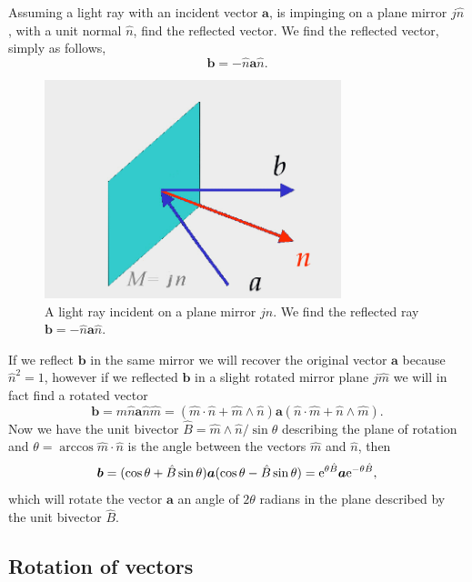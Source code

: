 \documentclass[prb,preprint]{revtex4}
\newcommand{\be}{\begin{equation}}
\newcommand{\ee}{\end{equation}}
\newcommand{\rme}{{\rm{e}}}
\newcommand{\iGA}{{j}}
\begin{document}
Assuming a light ray with an incident vector $ \boldsymbol{a} $, is impinging on a plane mirror $ \iGA \hat{n} $, with a unit normal $ \hat{n} $, find the reflected vector.  We find the reflected vector, simply as follows,
\be
\boldsymbol{b} = - \hat{n} \boldsymbol{a} \hat{n} .
\ee

\begin{figure}[htb]

\begin{center}
\includegraphics[width=3.4in]{Mirror}
\end{center}

\caption{A light ray incident on a plane mirror $ \iGA \hat{n} $.  We find the reflected ray $ \boldsymbol{b} = - \hat{n} \boldsymbol{a} \hat{n} $. \label{Mirror}}

\end{figure}

If we reflect $ \boldsymbol{b} $ in the same mirror we will recover the original vector $ \boldsymbol{a} $ because $  \hat{n}^2 = 1 $, however if we reflected $ \boldsymbol{b} $ in a slight rotated mirror plane $ \iGA \hat{m} $ we will in fact find a rotated vector
\be
\boldsymbol{b} =  \hat{m} \hat{n} \boldsymbol{a} \hat{n} \hat{m} = (  \hat{m} \cdot \hat{n} +  \hat{m} \wedge \hat{n} ) \boldsymbol{a} (  \hat{n} \cdot \hat{m} +  \hat{n} \wedge \hat{m} ) .
\ee
Now we have the unit bivector $ \hat{B} = \hat{m} \wedge \hat{n}/\sin \theta $ describing the plane of rotation and $ \theta =\arccos \hat{m} \cdot \hat{n} 
$ is the angle between the vectors $ \hat{m} $ and $ \hat{n} $, then
\be
\boldsymbol{b} =  ( \cos \theta + \hat{B}  \sin \theta ) \boldsymbol{a} ( \cos \theta - \hat{B}  \sin \theta ) = \rme^{\theta \hat{B} } \boldsymbol{a} \rme^{-\theta \hat{B} } ,
\ee
which will rotate the vector $ \boldsymbol{a} $ an angle of $ 2 \theta $ radians in the plane described by the unit bivector $ \hat{B} $.


\subsection{Rotation of vectors}
\end{document}
